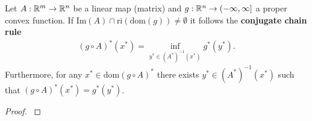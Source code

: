 \begin{theorem}
  \label{cvxa_conjugate_chain_rule}
  Let 
  $
    A:
      \mathbb{R}^m \to \mathbb{R}^n
  $
  be a linear map (matrix)
  and
  $
    g:
      \mathbb{R}^n \to (-\infty, \infty]
  $
  a proper convex function. If
  $
    \text{Im}(A) \cap \text{ri}(\text{dom}(g))
    \neq
    \emptyset
  $
  it follows
  the 
  \textbf{conjugate chain rule}
  \begin{gather}
    ( g \circ A )^* ( x^* )
    =
    \inf_
          { y^* \in ( A^* )^{ -1 } ( x^* )}
                                          g^*( y^* )
                                          .
  \end{gather}
  Furthermore, 
    for any 
      $
        x^* \in \text{dom}( g \circ A)^*
      $
        there exists
          $
            y^* \in ( A^* )^{ -1 } ( x^* )
          $
            such that
              $
                ( g \circ A)^* ( x^* )
                =
                g^*( y^* )
              $.
\end{theorem}
\begin{proof}
  \cite[Theorem~4.28(c)]{Mordukhovich2022}
\end{proof}



